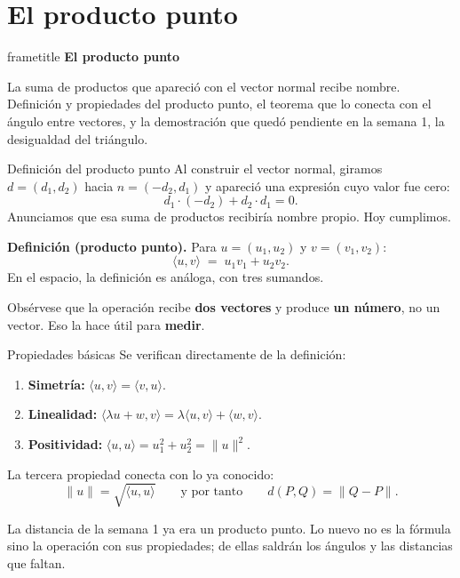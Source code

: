 \documentclass[aspectratio=169,10pt]{beamer}
\newcommand{\destaca}[1]{%
  \par\vspace{3pt}\noindent
  \colorbox{turquesaClaro}{%
    \parbox{\dimexpr\linewidth-2\fboxsep\relax}{\vspace{3pt}#1\vspace{3pt}}}%
  \par\vspace{3pt}}
\newcommand{\hojaSesion}[2]{%
  \vfill
  \begin{beamercolorbox}[wd=\textwidth,sep=16pt,center]{frametitle}
    {\Large\bfseries #1}\\[11pt]
    \begin{minipage}{0.82\textwidth}\centering\small #2\end{minipage}
  \end{beamercolorbox}
  \vfill}
\newcommand{\pp}[2]{\langle #1,#2\rangle}
\newcommand{\norma}[1]{\lVert #1\rVert}
\begin{document}
\section{El producto punto}
\begin{frame}[plain]
  \hojaSesion{El producto punto}{%
  La suma de productos que apareció con el vector normal recibe
  nombre. Definición y
  propiedades del producto punto, el teorema que lo conecta con el
  ángulo entre vectores, y la demostración que quedó pendiente en la
  semana 1, la desigualdad del triángulo.}
\end{frame}
\begin{frame}{Definición del producto punto}
  Al construir el vector normal, giramos $d=(d_1,d_2)$ hacia
  $n=(-d_2,d_1)$ y apareció una expresión cuyo valor fue cero:
  \[
    d_1\cdot(-d_2)+d_2\cdot d_1=0 .
  \]
  Anunciamos que esa suma de productos recibiría nombre propio.
  Hoy cumplimos.

  \vspace{0.2cm}
  \destaca{\textbf{Definición (producto punto).} Para $u=(u_1,u_2)$ y
  $v=(v_1,v_2)$:
  \[
    \pp{u}{v} \;=\; u_1v_1+u_2v_2 .
  \]
  En el espacio, la definición es análoga, con tres sumandos.}

  \vspace{0.2cm}
  Obsérvese que la operación recibe \textbf{dos vectores} y produce
  \textbf{un número}, no un vector. Eso la hace útil para
  \textbf{medir}.
\end{frame}
\begin{frame}{Propiedades básicas}
  Se verifican directamente de la definición:

  \vspace{0.2cm}
  \begin{enumerate}
    \item \textbf{Simetría:} $\pp{u}{v}=\pp{v}{u}$.
    \item \textbf{Linealidad:} $\pp{\lambda u+w}{v}
      =\lambda\pp{u}{v}+\pp{w}{v}$.
    \item \textbf{Positividad:} $\pp{u}{u}=u_1^2+u_2^2=\norma{u}^2$.
  \end{enumerate}

  \vspace{0.4cm}
  La tercera propiedad conecta con lo ya conocido:
  \[
    \norma{u}=\sqrt{\pp{u}{u}}
    \qquad\text{y por tanto}\qquad
    d(P,Q)=\norma{Q-P}.
  \]

  \vspace{0.1cm}
  \destaca{La distancia de la semana 1 ya era un producto punto. Lo
  nuevo no es la fórmula sino la operación con sus propiedades; de
  ellas saldrán los ángulos y las distancias que faltan.}
\end{frame}
\end{document}
